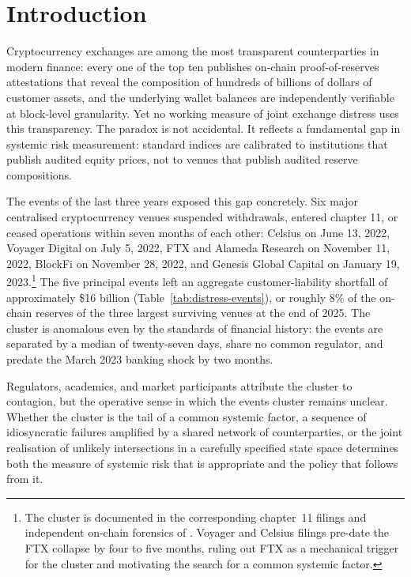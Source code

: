 \section{Introduction}\label{sec:intro}

Cryptocurrency exchanges are among the most transparent
counterparties in modern finance: every one of the top ten publishes
on-chain proof-of-reserves attestations that reveal the composition
of hundreds of billions of dollars of customer assets, and the
underlying wallet balances are independently verifiable at
block-level granularity. Yet no working measure of joint exchange
distress uses this transparency. The paradox is not accidental. It
reflects a fundamental gap in systemic risk measurement: standard
indices are calibrated to institutions that publish audited equity
prices, not to venues that publish audited reserve compositions.

The events of the last three years exposed this gap concretely.
Six major centralised cryptocurrency venues suspended withdrawals,
entered chapter 11, or ceased operations within seven months of
each other: Celsius on June 13, 2022, Voyager Digital on July 5,
2022, FTX and Alameda Research on November 11, 2022, BlockFi on
November 28, 2022, and Genesis Global Capital on January 19,
2023.\footnote{The cluster is documented in the corresponding
chapter~11 filings and independent on-chain forensics of
\citet{Griffin-Kruger-Mei2023}. Voyager and Celsius filings
pre-date the FTX collapse by four to five months, ruling out FTX
as a mechanical trigger for the cluster and motivating the search
for a common systemic factor.} The five principal events left an
aggregate customer-liability shortfall of approximately \$16 billion
(Table~\ref{tab:distress-events}), or roughly $8\%$ of the on-chain
reserves of the three largest surviving venues at the end of 2025.
The cluster is anomalous even by the standards of financial history:
the events are separated by a median of twenty-seven days, share no
common regulator, and predate the March 2023 banking shock by two
months.

Regulators, academics, and market participants attribute the
cluster to contagion, but the operative sense in which the events
cluster remains unclear. Whether the cluster is the tail of a
common systemic factor, a sequence of idiosyncratic failures
amplified by a shared network of counterparties, or the joint
realisation of unlikely intersections in a carefully specified
state space determines both the measure of systemic risk that is
appropriate and the policy that follows from it.

